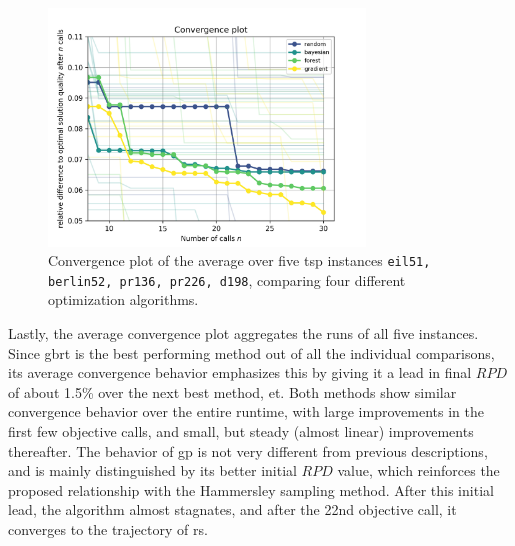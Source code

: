 \begin{figure}[h]
	\centering
	\includegraphics[width=0.75\textwidth]{results/part1/convergence_all.png}
	\caption[Convergence plot of the average over five \gls{tsp} instances]{Convergence plot of the average over five \gls{tsp} instances \texttt{eil51, berlin52, pr136, pr226, d198}, comparing four different optimization algorithms.}
	\label{fig:convergence_all}
\end{figure}

Lastly, the average convergence plot aggregates the runs of all five instances. Since \gls{gbrt} is the best performing method out of all the individual comparisons, its average convergence behavior emphasizes this by giving it a lead in final $RPD$ of about 1.5\% over the next best method, \gls{et}. Both methods show similar convergence behavior over the entire runtime, with large improvements in the first few objective calls, and small, but steady (almost linear) improvements thereafter. The behavior of \gls{gp} is not very different from previous descriptions, and is mainly distinguished by its better initial $RPD$ value, which reinforces the proposed relationship with the Hammersley sampling method. After this initial lead, the algorithm almost stagnates, and after the 22nd objective call, it converges to the trajectory of \gls{rs}.

